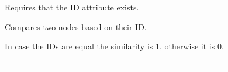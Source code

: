 
\precondition
Requires that the ID attribute exists.

\semantics
Compares two nodes based on their ID.

\returnvalue
In case the IDs are equal the similarity is 1,
otherwise it is 0. 

\parameters
-

\exceptions
{}

\test	
% 
%   
%   
% 
% 	
% 	
% 	
% 	
% 	
